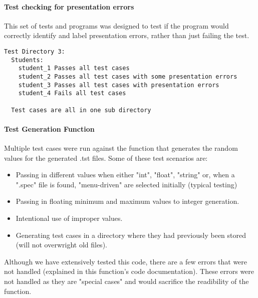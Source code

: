 \paragraph {Test checking for presentation errors}
This set of tests and programs was designed to test if the program would correctly identify and label presentation errors,
rather than just failing the test.
\begin {verbatim}
Test Directory 3:
  Students:
    student_1 Passes all test cases
    student_2 Passes all test cases with some presentation errors
    student_3 Passes all test cases with presentation errors
    student_4 Fails all test cases

  Test cases are all in one sub directory
\end {verbatim}

\paragraph{Test Generation Function}
Multiple test cases were run against the function that generates the random values for the generated .tst files. Some of these test scenarios are:
\begin{itemize}
    \item Passing in different values when either "int", "float", "string" or, when a ".spec" file is found, "menu-driven" are selected initially (typical testing)
    \item Passing in floating minimum and maximum values to integer generation. 
    \item Intentional use of improper values.
    \item Generating test cases in a directory where they had previously been stored (will not overwright old files).
\end{itemize}

Although we have extensively tested this code, there are a few errors that were not handled (explained in this function's code documentation). These errors were not handled as they are "special cases" and would sacrifice the readibility of the function. 
